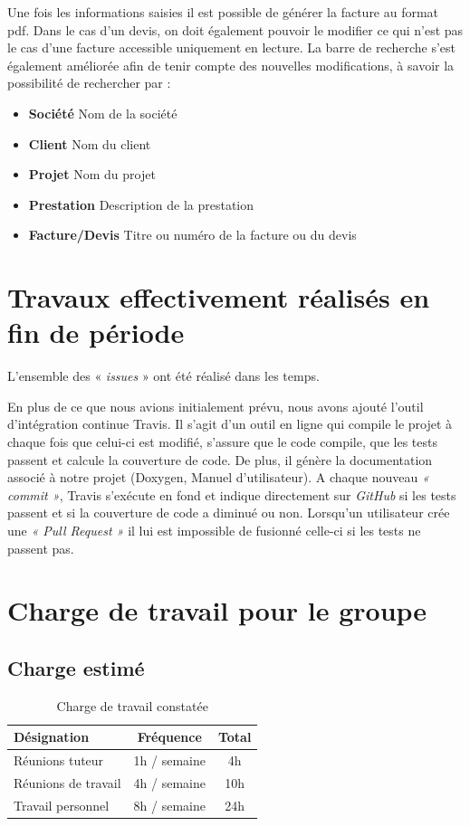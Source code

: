 \documentclass[12pt,a4paper,openany]{article}
\begin{document}
	Une fois les informations saisies il est possible de générer la facture au format pdf.
	Dans le cas d'un devis, on doit également pouvoir le modifier ce qui n'est pas le cas d'une facture accessible uniquement en lecture.
	La barre de recherche s'est également améliorée afin de tenir compte des nouvelles modifications, à savoir la possibilité de rechercher par : 
	\begin{itemize}
		\item \textbf{Société} Nom de la société
		\item \textbf{Client} Nom du client
		\item \textbf{Projet} Nom du projet
		\item \textbf{Prestation} Description de la prestation
		\item \textbf{Facture/Devis} Titre ou numéro de la facture ou du devis
	\end{itemize}  
	
	\section{Travaux effectivement réalisés en fin de période}
	L'ensemble des « \textit{issues} » ont été réalisé dans les temps. 

	En plus de ce que nous avions initialement prévu, nous avons ajouté l'outil d'intégration continue Travis. Il s'agit d'un outil en ligne qui compile le projet à chaque fois que celui-ci est modifié, s'assure que le code compile, que les tests passent et calcule la couverture de code. De plus, il génère la documentation associé à notre projet (Doxygen, Manuel d'utilisateur).
	A chaque nouveau \textit{ « commit »}, Travis s'exécute en fond et indique directement sur \textit{GitHub} si les tests passent et si la couverture de code a diminué ou non. Lorsqu'un utilisateur crée une \textit{« Pull Request »} il lui est impossible de fusionné celle-ci si les tests ne passent pas. 

	\section{Charge de travail pour le groupe}
	\subsection{Charge estimé}
	\begin{table}[H]
		\centering
		\begin{tabular}{l|c|c}
			\textbf{Désignation} & \textbf{Fréquence} & \textbf{Total}\\
			\hline
			Réunions tuteur & 1h / semaine & 4h\\
			Réunions de travail & 4h / semaine & 10h\\
			Travail personnel & 8h / semaine & 24h
		\end{tabular}
		\caption{Charge de travail constatée}
	\end{table}
\end{document}

